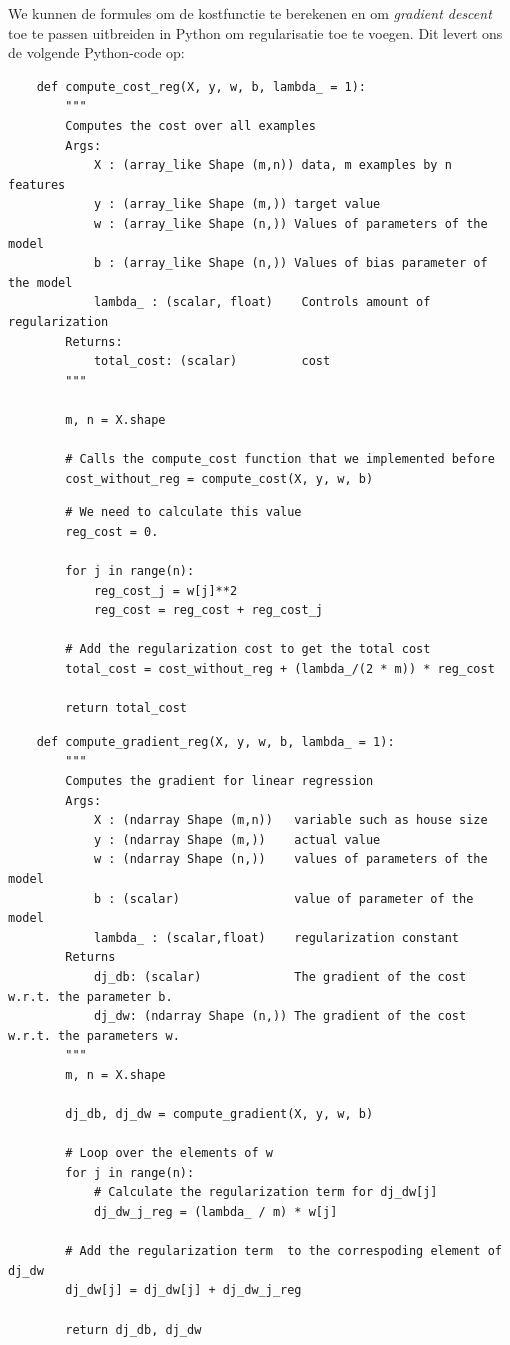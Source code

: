 We kunnen de formules om de kostfunctie te berekenen en om \textit{gradient descent} toe te passen uitbreiden in Python om regularisatie toe te voegen. Dit levert ons de volgende Python-code op:

\begin{lstlisting}
	def compute_cost_reg(X, y, w, b, lambda_ = 1):
	    """
	    Computes the cost over all examples
	    Args:
	        X : (array_like Shape (m,n)) data, m examples by n features
	        y : (array_like Shape (m,)) target value 
	        w : (array_like Shape (n,)) Values of parameters of the model      
	        b : (array_like Shape (n,)) Values of bias parameter of the model
	        lambda_ : (scalar, float)    Controls amount of regularization
	    Returns:
	        total_cost: (scalar)         cost 
	    """
	
	    m, n = X.shape
	
	    # Calls the compute_cost function that we implemented before
	    cost_without_reg = compute_cost(X, y, w, b) 
\end{lstlisting}
\begin{lstlisting}
	    # We need to calculate this value
	    reg_cost = 0.
	
	    for j in range(n):
	        reg_cost_j = w[j]**2
	        reg_cost = reg_cost + reg_cost_j
	
	    # Add the regularization cost to get the total cost
	    total_cost = cost_without_reg + (lambda_/(2 * m)) * reg_cost
	
	    return total_cost
\end{lstlisting}
\begin{lstlisting}	
	def compute_gradient_reg(X, y, w, b, lambda_ = 1): 
	    """
	    Computes the gradient for linear regression 
	    Args:
	        X : (ndarray Shape (m,n))   variable such as house size 
	        y : (ndarray Shape (m,))    actual value 
	        w : (ndarray Shape (n,))    values of parameters of the model      
	        b : (scalar)                value of parameter of the model  
	        lambda_ : (scalar,float)    regularization constant
	    Returns
	        dj_db: (scalar)             The gradient of the cost w.r.t. the parameter b. 
	        dj_dw: (ndarray Shape (n,)) The gradient of the cost w.r.t. the parameters w. 
	    """
	    m, n = X.shape
	
	    dj_db, dj_dw = compute_gradient(X, y, w, b)
	
	    # Loop over the elements of w
	    for j in range(n): 
	        # Calculate the regularization term for dj_dw[j]
	        dj_dw_j_reg = (lambda_ / m) * w[j]
	
	    # Add the regularization term  to the correspoding element of dj_dw
	    dj_dw[j] = dj_dw[j] + dj_dw_j_reg
	
	    return dj_db, dj_dw
\end{lstlisting}
